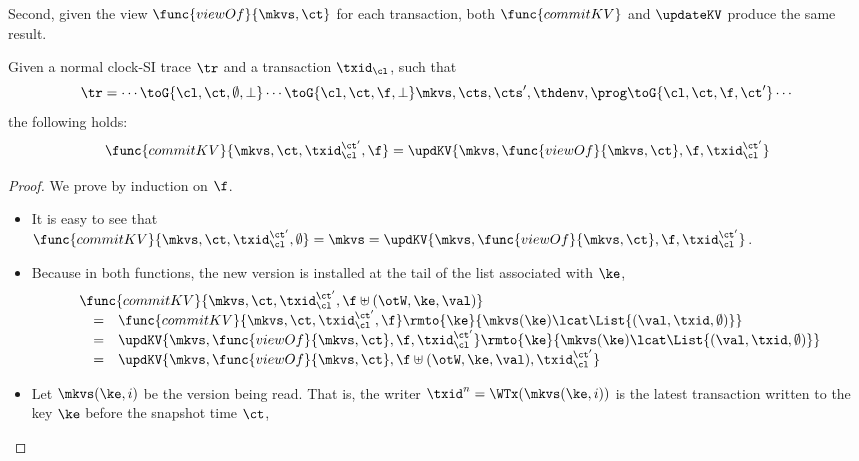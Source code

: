 Second, given the view \( \func{viewOf}{\mkvs,\ct} \) for each transaction, 
both \( \func{commitKV} \) and \( \updateKV \) produce the same result.
\begin{lemma}
    Given a normal clock-SI trace \( \tr \) and a transaction \( \txid_\cl \), such that
    \[
        \tr = \cdots \toG{\cl, \ct, \emptyset, \perp} \cdots \toG{\cl, \ct, \f, \perp} \mkvs, \cts, \cts', \thdenv, \prog  \toG{\cl, \ct, \f, \ct'} \cdots
    \] 
    the following holds:
    \[
        \func{commitKV}{\mkvs,\ct,\txid_\cl^{\ct'},\f} = \updKV{\mkvs, \func{viewOf}{\mkvs, \ct},\f, \txid_\cl^{\ct'}} 
    \]
\end{lemma}
\begin{proof}
    We prove by induction on \( \f \).
    \begin{itemize}
        \item \caseB{\( \f = \emptyset \)}
            It is easy to see that \( \func{commitKV}{\mkvs,\ct,\txid_\cl^{\ct'},\emptyset} = \mkvs =  \updKV{\mkvs, \func{viewOf}{\mkvs, \ct},\f, \txid_\cl^{\ct'}} \).
        \item \caseI{\( \f \uplus (\otW, \ke, \val) \)}
            Because in both functions, the new version is installed at the tail of the list associated with \( \ke \),
            \[
                \begin{array}{@{}l@{}}
                \func{commitKV}{\mkvs,\ct,\txid_\cl^{\ct'},\f \uplus (\otW, \ke, \val)}  \\
                \quad \begin{array}[t]{@{}c l@{}}
                = &
                \func{commitKV}{\mkvs,\ct,\txid_\cl^{\ct'},\f}\rmto{\ke}{\mkvs(\ke) \lcat \List{(\val, \txid, \emptyset)}} \\
                = & 
                \updKV{\mkvs,\func{viewOf}{\mkvs,\ct},\f,\txid_\cl^{\ct'}}\rmto{\ke}{\mkvs(\ke) \lcat \List{(\val, \txid, \emptyset)}} \\
                = & 
                \updKV{\mkvs,\func{viewOf}{\mkvs,\ct},\f \uplus (\otW, \ke, \val),\txid_\cl^{\ct'}}
                \end{array}
                \end{array}
            \]
        \item \caseI{\( \f \uplus (\otR, \ke, \val) \)}
            Let \( \mkvs(\ke,i) \) be the version being read.
            That is, the writer \( \txid^n = \WTx(\mkvs(\ke,i)) \)
            is the latest transaction written to the key \( \ke \) before the snapshot time \( \ct \),
            \[
\]
\end{itemize}
\end{proof}
